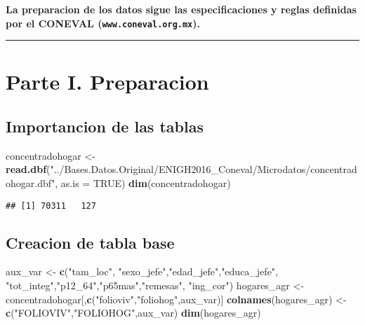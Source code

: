 \documentclass[11pt,]{article}
\newenvironment{Shaded}{\begin{snugshade}}{\end{snugshade}}
\newcommand{\KeywordTok}[1]{\textcolor[rgb]{0.13,0.29,0.53}{\textbf{#1}}}
\newcommand{\DataTypeTok}[1]{\textcolor[rgb]{0.13,0.29,0.53}{#1}}
\newcommand{\StringTok}[1]{\textcolor[rgb]{0.31,0.60,0.02}{#1}}
\newcommand{\OtherTok}[1]{\textcolor[rgb]{0.56,0.35,0.01}{#1}}
\newcommand{\NormalTok}[1]{#1}
\begin{document}
\textbf{La preparacion de los datos sigue las especificaciones y reglas
definidas por el CONEVAL (\texttt{www.coneval.org.mx}).}

\begin{center}\rule{0.5\linewidth}{\linethickness}\end{center}

\section{Parte I. Preparacion}\label{parte-i.-preparacion}

\subsection{Importancion de las
tablas}\label{importancion-de-las-tablas}

\begin{Shaded}
\begin{Highlighting}[]
\NormalTok{concentradohogar <-}\StringTok{ }\KeywordTok{read.dbf}\NormalTok{(}\StringTok{"../Bases.Datos.Original/ENIGH2016_Coneval/Microdatos/concentradohogar.dbf"}\NormalTok{, }
                       \DataTypeTok{as.is =} \OtherTok{TRUE}\NormalTok{)}
\KeywordTok{dim}\NormalTok{(concentradohogar)}
\end{Highlighting}
\end{Shaded}

\begin{verbatim}
## [1] 70311   127
\end{verbatim}

\subsection{Creacion de tabla base}\label{creacion-de-tabla-base}

\begin{Shaded}
\begin{Highlighting}[]
\NormalTok{aux_var <-}\StringTok{ }\KeywordTok{c}\NormalTok{(}\StringTok{"tam_loc"}\NormalTok{,}
             \StringTok{"sexo_jefe"}\NormalTok{,}\StringTok{"edad_jefe"}\NormalTok{,}\StringTok{"educa_jefe"}\NormalTok{,}
             \StringTok{"tot_integ"}\NormalTok{,}\StringTok{"p12_64"}\NormalTok{,}\StringTok{"p65mas"}\NormalTok{,}\StringTok{"remesas"}\NormalTok{,}
             \StringTok{"ing_cor"}\NormalTok{)}
\NormalTok{hogares_agr <-}\StringTok{ }\NormalTok{concentradohogar[,}\KeywordTok{c}\NormalTok{(}\StringTok{"folioviv"}\NormalTok{,}\StringTok{"foliohog"}\NormalTok{,aux_var)]}
\KeywordTok{colnames}\NormalTok{(hogares_agr) <-}\StringTok{ }\KeywordTok{c}\NormalTok{(}\StringTok{"FOLIOVIV"}\NormalTok{,}\StringTok{"FOLIOHOG"}\NormalTok{,aux_var)}
\KeywordTok{dim}\NormalTok{(hogares_agr)}
\end{Highlighting}
\end{Shaded}
\end{document}
